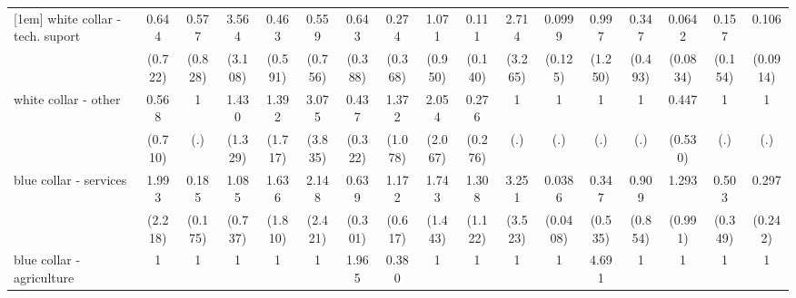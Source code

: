 {\begin{tabular}{l*{16}{c}}
[1em]
white collar - tech. suport&       0.644         &       0.577         &       3.564         &       0.463         &       0.559         &       0.643         &       0.274         &       1.071         &       0.111         &       2.714         &      0.0999         &       0.997         &       0.347         &      0.0642\sym{*}  &       0.157         &       0.106\sym{**} \\
                    &     (0.722)         &     (0.828)         &     (3.108)         &     (0.591)         &     (0.756)         &     (0.388)         &     (0.368)         &     (0.950)         &     (0.140)         &     (3.265)         &     (0.125)         &     (1.250)         &     (0.493)         &    (0.0834)         &     (0.154)         &    (0.0914)         \\
[1em]
white collar - other&       0.568         &           1         &       1.430         &       1.392         &       3.075         &       0.437         &       1.372         &       2.054         &       0.276         &           1         &           1         &           1         &           1         &       0.447         &           1         &           1         \\
                    &     (0.710)         &         (.)         &     (1.329)         &     (1.717)         &     (3.835)         &     (0.322)         &     (1.078)         &     (2.067)         &     (0.276)         &         (.)         &         (.)         &         (.)         &         (.)         &     (0.530)         &         (.)         &         (.)         \\
[1em]
blue collar - services&       1.993         &       0.185         &       1.085         &       1.636         &       2.148         &       0.639         &       1.172         &       1.743         &       1.308         &       3.251         &      0.0386\sym{**} &       0.347         &       0.909         &       1.293         &       0.503         &       0.297         \\
                    &     (2.218)         &     (0.175)         &     (0.737)         &     (1.810)         &     (2.421)         &     (0.301)         &     (0.617)         &     (1.443)         &     (1.122)         &     (3.523)         &    (0.0408)         &     (0.535)         &     (0.854)         &     (0.991)         &     (0.349)         &     (0.242)         \\
[1em]
blue collar - agriculture&           1         &           1         &           1         &           1         &           1         &       1.965         &       0.380         &           1         &           1         &           1         &           1         &       4.691         &           1         &           1         &           1         &           1         \\

\end{tabular}}
